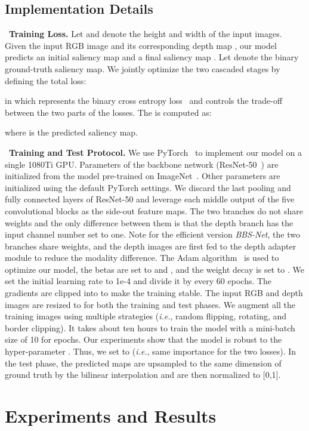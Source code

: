 \documentclass[journal]{IEEEtran}
\newcommand{\myPara}[1]{\vspace{10pt}\noindent~\textbf{#1} \quad}
\def\ie{\emph{i.e.}}
\def\ourmodel{\emph{BBS-Net}}
\begin{document}
\subsection{Implementation Details}\label{sec:implement}
\myPara{\textbf{Training Loss.}} Let  and  denote the height and width of the input images. Given the input RGB image  and its corresponding depth map , our model predicts an initial saliency map  and a final saliency map .
Let  denote the binary ground-truth saliency map. We jointly optimize the two cascaded stages by defining the total loss:

in which  represents the binary cross entropy loss~\cite{zhao2019CPFP} and  controls the trade-off between the two parts of the losses. The  is computed as:

where  is the predicted saliency map.\par
\myPara{\textbf{Training and Test Protocol.}}
We use PyTorch~\cite{steiner2019pytorch} to implement our model on a single 1080Ti GPU. Parameters of the backbone network (ResNet-50~\cite{He2016resnet}) are initialized from the model pre-trained on ImageNet~\cite{KrizhevskySH2012Imagenet}.
Other parameters are initialized using the default PyTorch settings.
We discard the last pooling and fully connected layers of ResNet-50 and
leverage each middle output of the five convolutional blocks as the side-out feature maps.
The two branches do not share weights and the only difference between them is that the
depth branch has the input channel number set to one.
Note for the efficient version \ourmodel, the two branches share weights, and the depth images are first fed to the depth adapter module to reduce the modality difference.
The Adam algorithm~\cite{KingmaB2014adam} is used to optimize our model, the betas are set to  and , and the weight decay is set to .
We set the initial learning rate to 1e-4 and divide it by  every 60 epochs.
The gradients are clipped into  to make the training stable.
The input RGB and depth images are resized to  for both the training and test phases.
We augment all the training images using multiple strategies (\ie, random flipping, rotating, and border clipping).
It takes about ten hours to train the model with a mini-batch size of 10 for  epochs.
Our experiments show that the model is robust to the hyper-parameter .
Thus, we set  to  (\ie, same importance for the two losses).
In the test phase, the predicted maps are upsampled to the same dimension of ground truth by the bilinear interpolation and are then normalized to [0,1].
\section{Experiments and Results}
\end{document}
